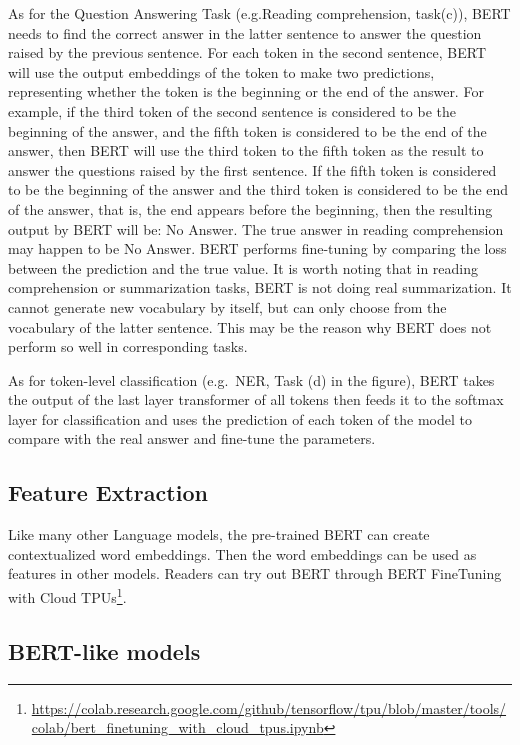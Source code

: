 \documentclass[]{krantz}
\renewcommand{\href}[2]{#2\footnote{\url{#1}}}
\begin{document}
As for the Question Answering Task (e.g.Reading comprehension, task(c)), BERT needs to find the correct answer in the latter sentence to answer the question raised by the previous sentence. For each token in the second sentence, BERT will use the output embeddings of the token to make two predictions, representing whether the token is the beginning or the end of the answer. For example, if the third token of the second sentence is considered to be the beginning of the answer, and the fifth token is considered to be the end of the answer, then BERT will use the third token to the fifth token as the result to answer the questions raised by the first sentence. If the fifth token is considered to be the beginning of the answer and the third token is considered to be the end of the answer, that is, the end appears before the beginning, then the resulting output by BERT will be: No Answer. The true answer in reading comprehension may happen to be No Answer. BERT performs fine-tuning by comparing the loss between the prediction and the true value. It is worth noting that in reading comprehension or summarization tasks, BERT is not doing real summarization. It cannot generate new vocabulary by itself, but can only choose from the vocabulary of the latter sentence. This may be the reason why BERT does not perform so well in corresponding tasks.

As for token-level classification (e.g.~NER, Task (d) in the figure), BERT takes the output of the last layer transformer of all tokens then feeds it to the softmax layer for classification and uses the prediction of each token of the model to compare with the real answer and fine-tune the parameters.

\hypertarget{feature-extraction}{%
\subsection{Feature Extraction}\label{feature-extraction}}

Like many other Language models, the pre-trained BERT can create contextualized word embeddings. Then the word embeddings can be used as features in other models. Readers can try out BERT through \href{https://colab.research.google.com/github/tensorflow/tpu/blob/master/tools/colab/bert_finetuning_with_cloud_tpus.ipynb}{BERT FineTuning with Cloud TPUs}.

\hypertarget{bert-like-models}{%
\subsection{BERT-like models}\label{bert-like-models}}
\end{document}
